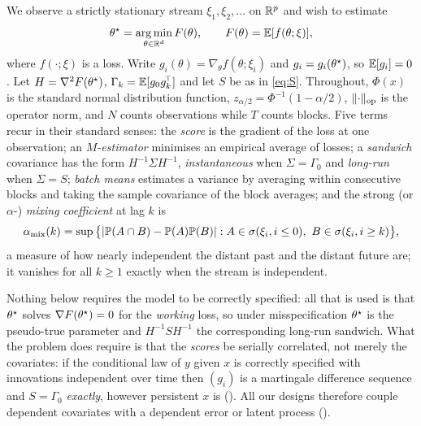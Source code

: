 We observe a strictly stationary stream $\xi_1,\xi_2,\dots$ on $\mathbb{R}^{p}$ and wish to estimate
\begin{equation}
\theta^\star=\operatorname*{arg\,min}_{\theta\in\mathbb{R}^d} F(\theta),\qquad F(\theta)=\mathbb{E}[f(\theta;\xi)],
\label{eq:obj}
\end{equation}
where $f(\cdot;\xi)$ is a loss. Write $g_i(\theta)=\nabla_\theta f(\theta;\xi_i)$ and
$g_i=g_i(\theta^\star)$, so $\mathbb{E}[g_i]=0$. Let $H=\nabla^2F(\theta^\star)$, $\Gamma_k=\mathbb{E}[g_0g_k^{\!\top}]$ and let $S$
be as in \eqref{eq:S}. Throughout, $\Phi(x)$ is the standard normal distribution function,
$z_{\alpha/2}=\Phi^{-1}(1-\alpha/2)$, $\lVert \cdot \rVert_{\mathrm{op}}$ is the operator norm, and $N$ counts
observations while $T$ counts blocks. Five terms recur in their standard senses: the \emph{score} is
the gradient of the loss at one observation; an \emph{$M$-estimator} minimises an empirical average
of losses; a \emph{sandwich} covariance has the form $H^{-1}\Sigma H^{-1}$, \emph{instantaneous}
when $\Sigma=\Gamma_0$ and \emph{long-run} when $\Sigma=S$; \emph{batch means} estimates a variance
by averaging within consecutive blocks and taking the sample covariance of the block averages; and
the strong (or $\alpha$-) \emph{mixing coefficient} at lag $k$ is
\begin{equation}
\alpha_{\mathrm{mix}}(k)=\sup\big\{|\mathbb{P}(A\cap B)-\mathbb{P}(A)\mathbb{P}(B)|:
A\in\sigma(\xi_i,i\le0),\ B\in\sigma(\xi_i,i\ge k)\big\},
\label{eq:mixdef}
\end{equation}
a measure of how nearly independent the distant past and the distant future are; it vanishes for all
$k\ge1$ exactly when the stream is independent.

Nothing below requires the model to be correctly specified: all that is used is that $\theta^\star$ solves
$\nabla F(\theta^\star)=0$ for the \emph{working} loss, so under misspecification $\theta^\star$ is the pseudo-true
parameter and $H^{-1}SH^{-1}$ the corresponding long-run sandwich. What the problem does require is
that the \emph{scores} be serially correlated, not merely the covariates: if the conditional law of
$y$ given $x$ is correctly specified with innovations independent over time then $(g_i)$ is a
martingale difference sequence and $S=\Gamma_0$ \emph{exactly}, however persistent $x$ is
(). All our designs therefore couple dependent covariates with a dependent error or
latent process ().

